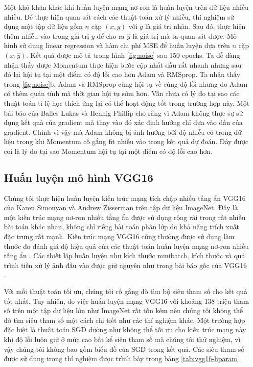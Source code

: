 Một khó khăn khác khi huấn luyện mạng nơ-ron là huấn luyện trên dữ liệu nhiều nhiễu. Để thực hiện quan sát cách các thuật toán xử lý nhiễu, thí nghiệm sử dụng một tập dữ liệu gồm $n$ cặp $(x,y)$ với $y$ là giá trị nhãn. Sau đó, thực hiện thêm nhiễu vào trong giá trị $y$ để cho ra $\hat y$ là giá trị mà ta quan sát được. Mô hình sử dụng linear regression và hàm chi phí MSE để huấn luyện dựa trên $n$ cặp $(x,\hat y)$. Kết quả được mô tả trong hình \ref{fig:noise} sau 150 epochs. Ta dễ dàng nhận thấy được Momentum thực hiện bước cập nhất đầu rất nhanh nhưng sau đó lại hội tụ tại một điểm có độ lỗi cao hơn Adam và RMSprop. Ta nhận thấy trong \ref{fig:noise}b, Adam và RMSprop cùng hội tụ về cùng độ lỗi nhưng do Adam có thêm quán tính mà thời gian hội tụ sớm hơn. Vẫn chưa có lý do tại sao các thuật toán tỉ lệ học thích ứng lại có thể hoạt động tốt trong trường hợp này. Một bài báo của Balles Lukas và Hennig Phillip \cite{balles2018dissecting} cho rằng vì Adam không thực sự sử dụng kết quả của gradient mà thay vào đó xác định hướng chỉ dựa vào dấu của gradient. Chính vì vậy mà Adam không bị ảnh hưởng bởi độ nhiễu có trong dữ liệu trong khi Momentum cố gắng fit nhiễu vào trong kết quả dự đoán. Đây được coi là lý do tại sao Momentum hội tụ tại một điểm có độ lỗi cao hơn.

\subsection{Huấn luyện mô hình VGG16}

Chúng tôi thực hiện huấn luyện kiến trúc mạng tích chập nhiều tầng ẩn VGG16 của Karen Simonyan và Andrew Zisserman \cite{simonyan2014verydeep} trên tập dữ liệu ImageNet. Đây là một kiến trúc mạng nơ-ron nhiều tầng ẩn được sử dụng rộng rãi trong rất nhiều bài toán khác nhau, không chỉ riêng bài toán phân lớp do khả năng trích xuất đặc trưng rất mạnh. Kiến trúc mạng VGG16 cũng thường được sử dụng làm thước đo đánh giá độ hiệu quả của các thuật toán huấn luyện mạng nơ-ron nhiều tầng ẩn \cite{zhuang2020adabelief} \cite{schneider2018deepobs}. Các thiết lập huấn luyện như kích thước minibatch, kích thước và quá trình tiền xử lý ảnh đầu vào được giữ nguyên như trong bài báo gốc của VGG16 \cite{simonyan2014verydeep}.

Với mỗi thuật toán tối ưu, chúng tôi cố gắng dò tìm bộ siêu tham số cho kết quả tốt nhất. Tuy nhiên, do việc huấn luyện mạng VGG16 với khoảng 138 triệu tham số trên một tập dữ liệu lớn như ImageNet rất tốn kém nên chúng tôi không thể dò tìm siêu tham số một cách chi tiết như các thí nghiệm khác. Một trường hợp đặc biệt là thuật toán SGD dường như không thể tối ưu cho kiến trúc mạng này khi độ lỗi luôn giữ ở mức cao bất kể siêu tham số mà chúng tôi thử nghiệm, vì vậy chúng tôi không bao gồm biểu đồ của SGD trong kết quả. Các siêu tham số được sử dụng trong thí nghiệm được trình bày trong bảng \ref{tab:vgg16-hparam}

